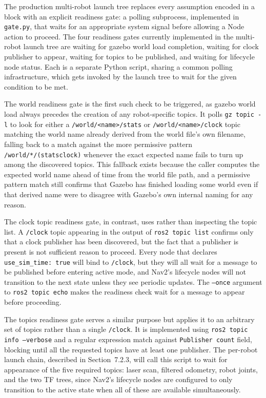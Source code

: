The production multi-robot launch tree replaces every assumption encoded in a  block with an explicit readiness gate: a polling subprocess, implemented in \texttt{gate.py}, that waits for an appropriate system signal before allowing a Node action to proceed. The four readiness gates currently implemented in the multi-robot launch tree are waiting for gazebo world load completion, waiting for clock publisher to appear, waiting for topics to be published, and waiting for lifecycle node status. Each is a separate Python script, sharing a common polling infrastructure, which gets invoked by the launch tree to wait for the given condition to be met.

The world readiness gate is the first such check to be triggered, as gazebo world load always precedes the creation of any robot-specific topics. It polls \texttt{gz topic -l} to look for either a \texttt{/world/<name>/stats} or \texttt{/world/<name>/clock} topic matching the world name already derived from the world file's own filename, falling back to a match against the more permissive pattern \texttt{/world/*/(stats\textbar clock)} whenever the exact expected name fails to turn up among the discovered topics. This fallback exists because the caller computes the expected world name ahead of time from the world file path, and a permissive pattern match still confirms that Gazebo has finished loading some world even if that derived name were to disagree with Gazebo's own internal naming for any reason.

The clock topic readiness gate, in contrast, uses  rather than inspecting the topic list. A \texttt{/clock} topic appearing in the output of \texttt{ros2 topic list} confirms only that a clock publisher has been discovered, but the fact that a publisher is present is not sufficient reason to proceed. Every node that declares \texttt{use\_sim\_time: true} will bind to \texttt{/clock}, but they will all wait for a message to be published before entering active mode, and Nav2's lifecycle nodes will not transition to the next state unless they see periodic updates. The \texttt{--once} argument to \texttt{ros2 topic echo} makes the readiness check wait for a message to appear before proceeding.

The topics readiness gate serves a similar purpose but applies it to an arbitrary set of topics rather than a single \texttt{/clock}. It is implemented using \texttt{ros2 topic info --verbose} and a regular expression match against \texttt{Publisher count} field, blocking until all the requested topics have at least one publisher. The per-robot launch chain, described in Section~7.2.3, will call this script to wait for appearance of the five required topics: laser scan, filtered odometry, robot joints, and the two TF trees, since Nav2's lifecycle nodes are configured to only transition to the active state when all of these are available simultaneously.

